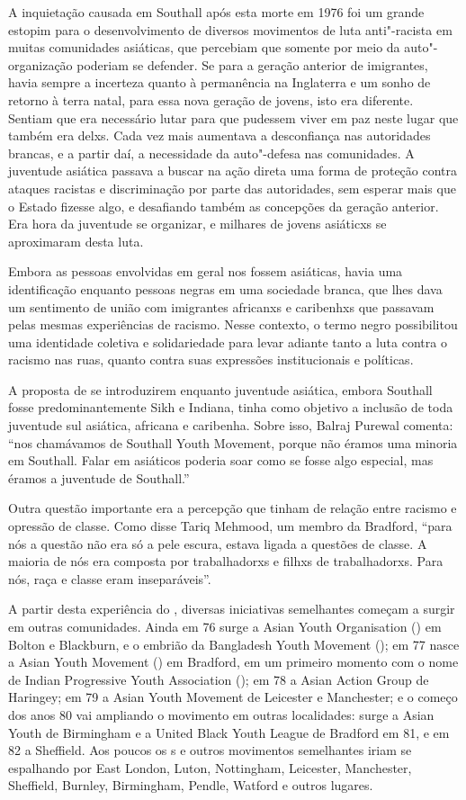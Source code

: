 A inquietação causada em Southall após esta morte em 1976 foi um grande estopim para o desenvolvimento de diversos movimentos de luta anti"-racista em muitas comunidades asiáticas, que percebiam que somente por meio da auto"-organização poderiam se defender. Se para a geração anterior de imigrantes, havia sempre a incerteza quanto à permanência na Inglaterra e um sonho de retorno à terra natal, para essa nova geração de jovens, isto era diferente. Sentiam que era necessário lutar para que pudessem viver em paz neste lugar que também era delxs. Cada vez mais aumentava a desconfiança nas autoridades brancas, e a partir daí, a necessidade da auto"-defesa nas comunidades. A juventude asiática passava a buscar na ação direta uma forma de proteção contra ataques racistas e discriminação por parte das autoridades, sem esperar mais que o Estado fizesse algo, e desafiando também as concepções da geração anterior. Era hora da juventude se organizar, e milhares de jovens asiáticxs se aproximaram desta luta.

Embora as pessoas envolvidas em geral nos  fossem asiáticas, havia uma identificação enquanto pessoas negras em uma sociedade branca, que lhes dava um sentimento de união com imigrantes africanxs e caribenhxs que passavam pelas mesmas experiências de racismo. Nesse contexto, o termo negro possibilitou uma identidade coletiva e solidariedade para levar adiante tanto a luta contra o racismo nas ruas, quanto contra suas expressões institucionais e políticas.


A proposta de se introduzirem enquanto juventude asiática, embora Southall fosse predominantemente Sikh e Indiana, tinha como objetivo a inclusão de toda juventude sul asiática, africana e caribenha. Sobre isso, Balraj Purewal comenta: ``nos chamávamos de Southall Youth Movement, porque não éramos uma minoria em Southall. Falar em asiáticos poderia soar como se fosse algo especial, mas éramos a juventude de Southall.''

Outra questão importante era a percepção que tinham de relação entre racismo e opressão de classe. Como disse Tariq Mehmood, um membro da  Bradford, ``para nós a questão não era só a pele escura, estava ligada a questões de classe. A maioria de nós era composta por trabalhadorxs e filhxs de trabalhadorxs. Para nós, raça e classe eram inseparáveis''.

A partir desta experiência do , diversas iniciativas semelhantes começam a surgir em outras comunidades. Ainda em 76 surge a Asian Youth Organisation () em Bolton e Blackburn, e o embrião da Bangladesh Youth Movement (); em 77 nasce a Asian Youth Movement () em Bradford, em um primeiro momento com o nome de Indian Progressive Youth Association (); em 78 a Asian Action Group de Haringey; em 79 a Asian Youth Movement de Leicester e Manchester; e o começo dos anos 80 vai ampliando o movimento em outras localidades: surge a Asian Youth de Birmingham e a United Black Youth League de Bradford em 81, e em 82 a  Sheffield. Aos poucos os s e outros movimentos semelhantes iriam se espalhando por East London, Luton, Nottingham, Leicester, Manchester, Sheffield, Burnley, Birmingham, Pendle, Watford e outros lugares.

